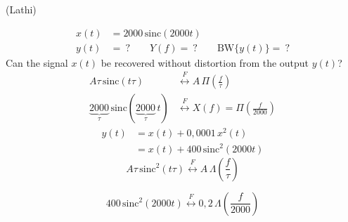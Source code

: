 \documentclass[11pt,a4paper]{article}
\begin{document}
\begin{ornek}
(Lathi)
\end{ornek}
\begin{center}
\end{center}
\begin{align*}
x(t)&=2000\,\mathrm{sinc}(2000t)\\
y(t)&=\ ?\qquad Y(f)=\ ?\qquad \mathrm{BW}\{y(t)\}=\ ?
\end{align*}
Can the signal $x(t)$ be recovered without distortion from the output $y(t)$?
\begin{align*}
A\tau\,\mathrm{sinc}(t\tau)&\overset{F}{\longleftrightarrow}A\,\Pi\!\left(\frac{f}{\tau}\right)\\
\underbrace{2000}_{\tau}\,\mathrm{sinc}(\underbrace{2000}_{\tau}\,t)&\overset{F}{\longleftrightarrow}X(f)=\Pi\!\left(\frac{f}{2000}\right)
\end{align*}
\begin{align*}
y(t)&=x(t)+0{,}0001\,x^2(t)\\
&=x(t)+400\,\mathrm{sinc}^2(2000t)
\end{align*}
\[
A\tau\,\mathrm{sinc}^2(t\tau)\overset{F}{\longleftrightarrow}A\,\Lambda\!\left(\frac{f}{\tau}\right)
\]

\[
400\,\mathrm{sinc}^2(2000t)\overset{F}{\longleftrightarrow}0{,}2\,\Lambda\!\left(\frac{f}{2000}\right)
\]
\end{document}
